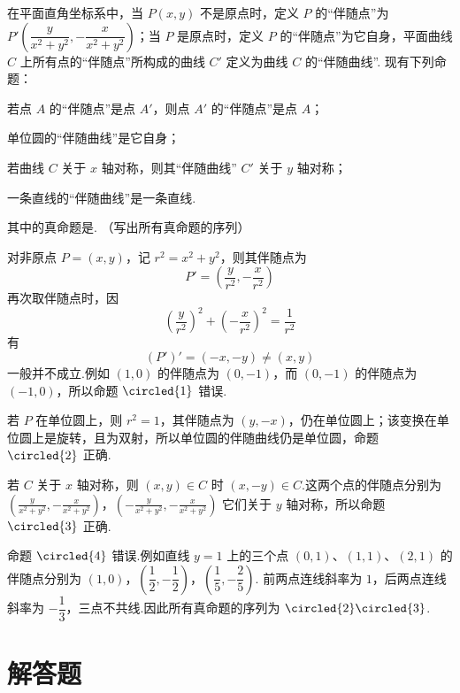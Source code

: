 \begin{problem}
在平面直角坐标系中，当 \(P(x,y)\) 不是原点时，定义 \(P\) 的“伴随点”为 \(P'\left(\dfrac{y}{x^2+y^2},-\dfrac{x}{x^2+y^2}\right)\)；当 \(P\) 是原点时，定义 \(P\) 的“伴随点”为它自身，平面曲线 \(C\) 上所有点的“伴随点”所构成的曲线 \(C'\) 定义为曲线 \(C\) 的“伴随曲线”. 现有下列命题：

\begin{circlelist}
\item 若点 \(A\) 的“伴随点”是点 \(A'\)，则点 \(A'\) 的“伴随点”是点 \(A\)；
\item 单位圆的“伴随曲线”是它自身；
\item 若曲线 \(C\) 关于 \(x\) 轴对称，则其“伴随曲线” \(C'\) 关于 \(y\) 轴对称；
\item 一条直线的“伴随曲线”是一条直线.
\end{circlelist}

其中的真命题是\fillinblank{}. （写出所有真命题的序列）

\begin{solution}
对非原点 \(P=(x,y)\)，记 \(r^2=x^2+y^2\)，则其伴随点为
\[
P'=\left(\frac y{r^2},-\frac x{r^2}\right)
\]
再次取伴随点时，因
\[
\left(\dfrac y{r^2}\right)^2+\left(-\dfrac x{r^2}\right)^2=\dfrac1{r^2}
\]
有
\[
(P')'=\left(-x,-y\right)\neq(x,y)
\]
一般并不成立.例如 \((1,0)\) 的伴随点为 \((0,-1)\)，而 \((0,-1)\) 的伴随点为 \((-1,0)\)，所以命题 \(\circled{1}\) 错误.

若 \(P\) 在单位圆上，则 \(r^2=1\)，其伴随点为 \((y,-x)\)，仍在单位圆上；该变换在单位圆上是旋转，且为双射，所以单位圆的伴随曲线仍是单位圆，命题 \(\circled{2}\) 正确.

若 \(C\) 关于 \(x\) 轴对称，则 \((x,y)\in C\) 时 \((x,-y)\in C\).这两个点的伴随点分别为
\(\left(\frac y{x^2+y^2},-\frac x{x^2+y^2}\right)\)，\(\left(-\frac y{x^2+y^2},-\frac x{x^2+y^2}\right)\)
它们关于 \(y\) 轴对称，所以命题 \(\circled{3}\) 正确.

命题 \(\circled{4}\) 错误.例如直线 \(y=1\) 上的三个点 \((0,1)\)、\((1,1)\)、\((2,1)\) 的伴随点分别为
\((1,0)\)，\(\left(\dfrac12,-\dfrac12\right)\)，\(\left(\dfrac15,-\dfrac25\right)\).
前两点连线斜率为 \(1\)，后两点连线斜率为 \(-\dfrac13\)，三点不共线.因此所有真命题的序列为 \(\circled{2}\circled{3}\).
\end{solution}
\end{problem}


\section{解答题}

